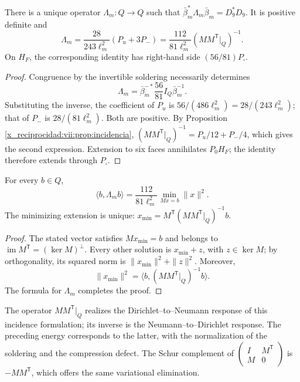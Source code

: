 \begin{theorem}
\label{x_reciprocidad:vii:thm:respuesta-unica}
There is a unique operator \(\Lambda_m:Q\longrightarrow Q\) such that
\(\bar\beta_m^*\Lambda_m\bar\beta_m=D_9^*D_9\). It is positive definite and
\begin{equation}
 \Lambda_m=\frac{28}{243\ell_m^2}(P_u+3P_-)
 =\frac{112}{81\ell_m^2}
       (MM^{\mathsf T}|_Q)^{-1}.
 \label{x_reciprocidad:vii:eq:lambda-pantalla}
\end{equation}
On \(H_F\), the corresponding identity has right-hand side
\((56/81)P_\square\).
\end{theorem}

\begin{proof}
Congruence by the invertible soldering necessarily determines
\[
 \Lambda_m=\bar\beta_m^{-*}\frac{56}{81}I_Q\bar\beta_m^{-1}.
\]
Substituting the inverse, the coefficient of \(P_u\) is
\(56/(486\ell_m^2)=28/(243\ell_m^2)\); that of \(P_-\) is
\(28/(81\ell_m^2)\). Both are positive. By
Proposition \ref{x_reciprocidad:vii:prop:incidencia},
\((MM^{\mathsf T}|_Q)^{-1}=P_u/12+P_-/4\),
which gives the second expression. Extension to six faces annihilates
\(P_0H_F\); the identity therefore extends through \(P_\square\).
\end{proof}

\begin{proposition}
\label{x_reciprocidad:vii:prop:minima-extension}
For every \(b\in Q\),
\[
 \langle b,\Lambda_m b\rangle
 =\frac{112}{81\ell_m^2}
   \min_{Mx=b}\|x\|^2.
\]
The minimizing extension is unique:
\(x_{\min}=M^{\mathsf T}(MM^{\mathsf T}|_Q)^{-1}b\).
\end{proposition}

\begin{proof}
The stated vector satisfies \(Mx_{\min}=b\) and belongs to
\(\operatorname{im}M^{\mathsf T}=(\ker M)^\perp\).
Every other solution is \(x_{\min}+z\), with \(z\in\ker M\); by
orthogonality, its squared norm is \(\|x_{\min}\|^2+\|z\|^2\).
Moreover,
\[
 \|x_{\min}\|^2
 =\langle b,(MM^{\mathsf T}|_Q)^{-1}b\rangle.
\]
The formula for \(\Lambda_m\) completes the proof.
\end{proof}

The operator \(MM^{\mathsf T}|_Q\) realizes the
Dirichlet--to--Neumann response of this incidence formulation; its inverse
is the Neumann--to--Dirichlet response. The preceding energy corresponds
to the latter, with the normalization of the soldering and the compression
defect. The Schur complement of
\(\left(\begin{smallmatrix}I&M^{\mathsf T}\\M&0\end{smallmatrix}\right)\)
is \(-MM^{\mathsf T}\), which offers the same variational elimination.

